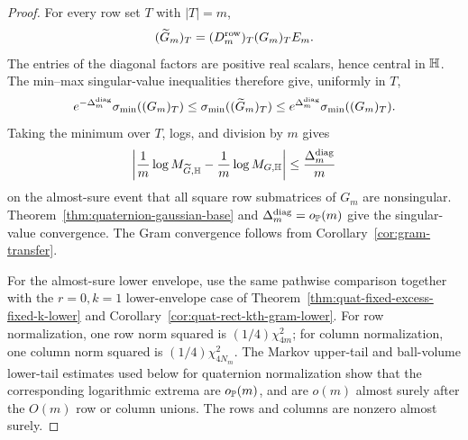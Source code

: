 \begin{proof}
For every row set \(T\) with \(|T|=m\),
\[
  (\widetilde G_m)_T=(D_m^{\rm row})_T(G_m)_TE_m .
\]
The entries of the diagonal factors are positive real scalars, hence central in
\(\mathbb{H}\).  The min--max singular-value inequalities therefore give, uniformly
in \(T\),
\[
  e^{-\Delta_m^{\rm diag}}\sigma_{\min}((G_m)_T)
  \le \sigma_{\min}((\widetilde G_m)_T)
  \le e^{\Delta_m^{\rm diag}}\sigma_{\min}((G_m)_T).
\]
Taking the minimum over \(T\), logs, and division by \(m\) gives
\[
  \left|
  \frac1m\log M_{\widetilde G,\mathbb{H}}
  -\frac1m\log M_{G,\mathbb{H}}
  \right|
  \le \frac{\Delta_m^{\rm diag}}m
\]
on the almost-sure event that all square row submatrices of \(G_m\) are
nonsingular.  Theorem~\ref{thm:quaternion-gaussian-base} and
\(\Delta_m^{\rm diag}=o_{\mathbb{P}}(m)\) give the singular-value convergence.  The
Gram convergence follows from Corollary~\ref{cor:gram-transfer}.

For the almost-sure lower envelope, use the same pathwise comparison together
with the \(r=0,k=1\) lower-envelope case of
Theorem~\ref{thm:quat-fixed-excess-fixed-k-lower} and
Corollary~\ref{cor:quat-rect-kth-gram-lower}.  For row normalization, one row
norm squared is \((1/4)\chi^2_{4m}\); for column normalization, one column norm
squared is \((1/4)\chi^2_{4N_m}\).  The Markov upper-tail and ball-volume
lower-tail estimates used below for quaternion normalization show that the
corresponding logarithmic extrema are \(o_{\mathbb{P}}(m)\), and are \(o(m)\) almost
surely after the \(O(m)\) row or column unions.  The rows and columns are
nonzero almost surely.
\end{proof}

